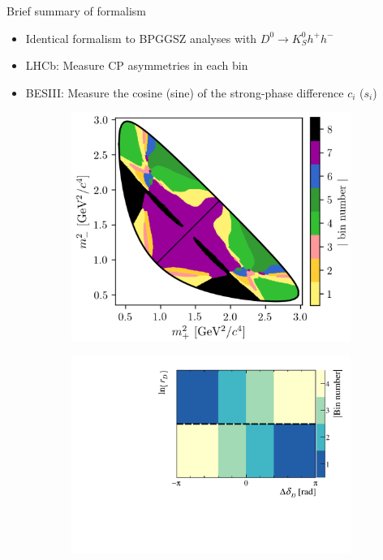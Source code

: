 \documentclass{beamer}
\begin{document}
\begin{frame}{Brief summary of formalism}
  \begin{itemize}
    \setlength\itemsep{0.5em}
    \item{Identical formalism to BPGGSZ analyses with $D^0\to K_S^0h^+h^-$}
    \item{LHCb: Measure CP asymmetries in each bin}
    \item{BESIII: Measure the cosine (sine) of the strong-phase difference $c_i$ ($s_i$)}
  \end{itemize}
  \begin{figure}
    \centering
    \begin{subfigure}{0.37\textwidth}
      \includegraphics[width = 1.0\textwidth]{Plots/DalitzKSpipi.png}
    \end{subfigure}%
    \hspace{1cm}
    \begin{subfigure}{0.42\textwidth}
      \includegraphics[width = 1.0\textwidth]{Plots/BinningSchemePlot_4Bins.pdf}

\end{subfigure}
\end{figure}
\end{frame}
\end{document}
